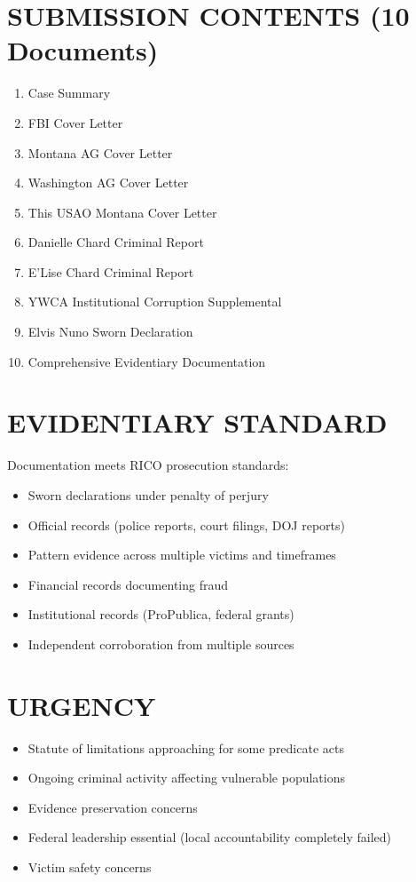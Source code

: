 \documentclass[12pt,oneside]{article}
\begin{document}
\begin{flushleft}
\section*{SUBMISSION CONTENTS (10 Documents)}

\begin{enumerate}
\item Case Summary
\item FBI Cover Letter
\item Montana AG Cover Letter
\item Washington AG Cover Letter
\item This USAO Montana Cover Letter
\item Danielle Chard Criminal Report
\item E'Lise Chard Criminal Report
\item YWCA Institutional Corruption Supplemental
\item Elvis Nuno Sworn Declaration
\item Comprehensive Evidentiary Documentation
\end{enumerate}

\section*{EVIDENTIARY STANDARD}

Documentation meets RICO prosecution standards:
\begin{itemize}
\item Sworn declarations under penalty of perjury
\item Official records (police reports, court filings, DOJ reports)
\item Pattern evidence across multiple victims and timeframes
\item Financial records documenting fraud
\item Institutional records (ProPublica, federal grants)
\item Independent corroboration from multiple sources
\end{itemize}

\section*{URGENCY}

\begin{itemize}
\item Statute of limitations approaching for some predicate acts
\item Ongoing criminal activity affecting vulnerable populations
\item Evidence preservation concerns
\item Federal leadership essential (local accountability completely failed)
\item Victim safety concerns
\end{itemize}


\end{flushleft}
\end{document}
